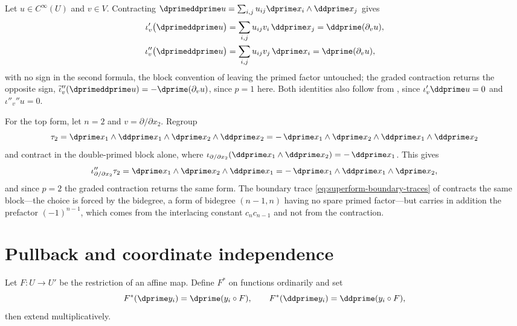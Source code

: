 \begin{example}
\label{ex:ch09-contraction-examples}
Let $u\in C^\infty(U)$ and $v\in V$.  Contracting
$\dprimeddprime u=\sum_{i,j}u_{ij}\dprime x_i\wedge\ddprime x_j$ gives
\[
 \begin{aligned}
  \iota'_v\bigl(\dprimeddprime u\bigr)
   &=\sum_{i,j}u_{ij}v_i\,\ddprime x_j
     =\ddprime(\partial_vu),\\
    \iota''_v\bigl(\dprimeddprime u\bigr)
   &=\sum_{i,j}u_{ij}v_j\,\dprime x_i
     =\dprime(\partial_vu),
 \end{aligned}
\]
with no sign in the second formula, the block convention of
 leaving the primed factor untouched; the graded
contraction returns the opposite sign,
$\widetilde\iota''_v(\dprimeddprime u)=-\dprime(\partial_vu)$, since $p=1$
here.  Both identities also follow from , since
$\iota'_v\ddprime u=0$ and $\iota''_v\dprime u=0$.

For the top form, let $n=2$ and $v=\partial/\partial x_2$.  Regroup
\[
 \tau_2=\dprime x_1\wedge\ddprime x_1\wedge\dprime x_2\wedge\ddprime x_2
 =-\,\dprime x_1\wedge\dprime x_2\wedge\ddprime x_1\wedge\ddprime x_2
\]
and contract in the double-primed block alone, where
$\iota_{\partial/\partial x_2}(\ddprime x_1\wedge\ddprime x_2)
=-\,\ddprime x_1$.  This gives
\[
 \iota''_{\partial/\partial x_2}\tau_2
 =\dprime x_1\wedge\dprime x_2\wedge\ddprime x_1
 =-\,\dprime x_1\wedge\ddprime x_1\wedge\dprime x_2 ,
\]
and since $p=2$ the graded contraction returns the same form.  The boundary
trace \eqref{eq:superform-boundary-traces} of
 contracts the same block---the choice is
forced by the bidegree, a form of bidegree $(n-1,n)$ having no spare primed
factor---but carries in addition the prefactor $(-1)^{n-1}$, which comes from
the interlacing constant $c_nc_{n-1}$ and not from the contraction.
\end{example}

\section{Pullback and coordinate independence}
\label{sec:ch09-pullback}

Let $F:U\to U'$ be the restriction of an affine map. Define $F^*$ on
functions ordinarily and set
\[
F^*(\dprime y_i)=\dprime(y_i\circ F),\qquad
F^*(\ddprime y_i)=\ddprime(y_i\circ F),
\]
then extend multiplicatively.

